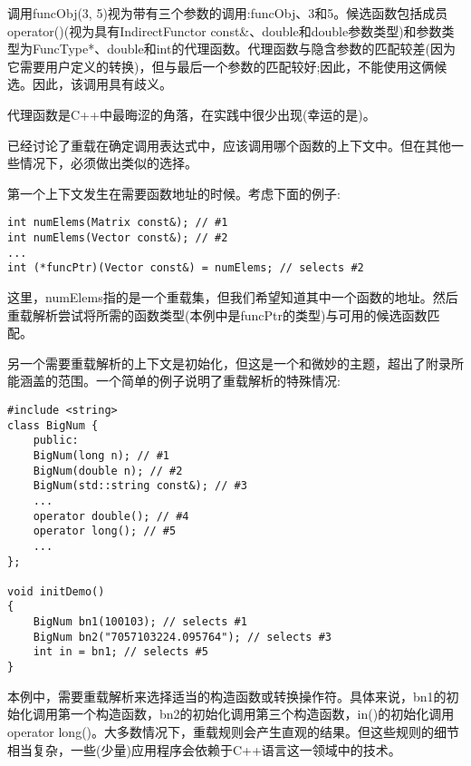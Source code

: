 调用funcObj(3, 5)视为带有三个参数的调用:funcObj、3和5。候选函数包括成员operator()(视为具有IndirectFunctor const\&、double和double参数类型)和参数类型为FuncType*、double和int的代理函数。代理函数与隐含参数的匹配较差(因为它需要用户定义的转换)，但与最后一个参数的匹配较好;因此，不能使用这俩候选。因此，该调用具有歧义。

代理函数是C++中最晦涩的角落，在实践中很少出现(幸运的是)。


已经讨论了重载在确定调用表达式中，应该调用哪个函数的上下文中。但在其他一些情况下，必须做出类似的选择。

第一个上下文发生在需要函数地址的时候。考虑下面的例子:

\begin{lstlisting}[style=styleCXX]
int numElems(Matrix const&); // #1
int numElems(Vector const&); // #2
...
int (*funcPtr)(Vector const&) = numElems; // selects #2
\end{lstlisting}

这里，numElems指的是一个重载集，但我们希望知道其中一个函数的地址。然后重载解析尝试将所需的函数类型(本例中是funcPtr的类型)与可用的候选函数匹配。

另一个需要重载解析的上下文是初始化，但这是一个和微妙的主题，超出了附录所能涵盖的范围。一个简单的例子说明了重载解析的特殊情况:

\begin{lstlisting}[style=styleCXX]
#include <string>
class BigNum {
	public:
	BigNum(long n); // #1
	BigNum(double n); // #2
	BigNum(std::string const&); // #3
	...
	operator double(); // #4
	operator long(); // #5
	...
};

void initDemo()
{
	BigNum bn1(100103); // selects #1
	BigNum bn2("7057103224.095764"); // selects #3
	int in = bn1; // selects #5
}
\end{lstlisting}

本例中，需要重载解析来选择适当的构造函数或转换操作符。具体来说，bn1的初始化调用第一个构造函数，bn2的初始化调用第三个构造函数，in()的初始化调用operator long()。大多数情况下，重载规则会产生直观的结果。但这些规则的细节相当复杂，一些(少量)应用程序会依赖于C++语言这一领域中的技术。













